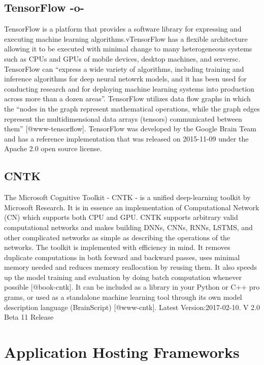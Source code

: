       
\subsection{TensorFlow -o-}

TensorFlow is a platform that provides a software library for
expressing and executing machine learning algorithms.vTensorFlow has a
flexible architecture allowing it to be executed with minimal change
to many heterogeneous systems such as CPUs and GPUs of mobile devices,
desktop machines, and serversc\cite{tensorflow-paper-2016}.
TensorFlow can ``express a wide variety of algorithms, including
training and inference algorithms for deep neural netowrk models, and
it has been used for conducting research and for deploying machine
learning systems into production across more than a dozen
areas''. TensorFlow utilizes data flow graphs in which the ``nodes in
the graph represent mathematical operations, while the graph edges
represent the multidimensional data arrays (tensors) communicated
between them'' [@www-tensorflow].  TensorFlow was developed by the
Google Brain Team and has a reference implementation that was released
on 2015-11-09 under the Apache 2.0 open source license.


    
\subsection{CNTK}

The Microsoft Cognitive Toolkit - CNTK - is a unified deep-learning
toolkit by Microsoft Research. It is in essence an implementation of
Computational Network (CN) which supports both CPU and GPU. CNTK
supports arbitrary valid computational networks and makes building
DNNs, CNNs, RNNs, LSTMS, and other complicated networks as simple as
describing the operations of the networks.  The toolkit is implemented
with efficiency in mind. It removes duplicate computations in both
forward and backward passes, uses minimal memory needed and reduces
memory reallocation by reusing them. It also speeds up the model
training and evaluation by doing batch computation whenever
possible [@book-cntk]. It can be included as a library in your
Python or C++ pro grams, or used as a standalone machine learning tool
through its own model description language
(BrainScript) [@www-cntk]. Latest Version:2017-02-10. V 2.0 Beta
11 Release


\section{Application Hosting Frameworks}

